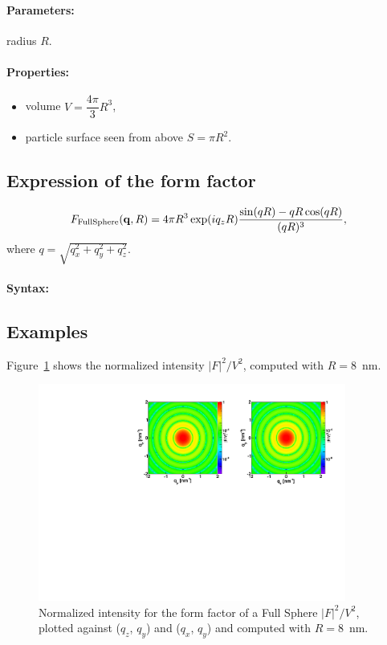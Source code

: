 \FloatBarrier

\paragraph{Parameters:} radius $R$.

\paragraph{Properties:}
\begin{itemize}
\item volume $V = \dfrac{4\pi}{3}R^3$,
\item particle surface seen from above $S= \pi R^2$.
\end{itemize}

\subsection{Expression of the form factor}
\begin{equation}
F_{\rm{FullSphere}}(\mathbf{q},R) = 4\pi R^3 \exp(iq_z R)\frac{\sin(q R) - q R \cos(q R)}{(qR)^3},
\end{equation}
where $q=\sqrt{q_x^2 + q_y^2 + q_z^2}$.

\paragraph{Syntax:} 


\subsection{Examples}
Figure~\ref{figFFFSphereEx} shows the normalized intensity $|F|^2/V^2$, computed with $R=8$~nm.
\begin{figure}[h]
\begin{center}
\includegraphics[width=0.9\textwidth]{Figures/figfffsphere}
\end{center}
\caption{Normalized intensity for the
  form factor of a Full Sphere
  $|F|^2/V^2$, plotted against ($q_z$, $q_y$) and ($q_x$, $q_y$) and computed with $R=8$~nm.}
\label{figFFFSphereEx}
\end{figure}

